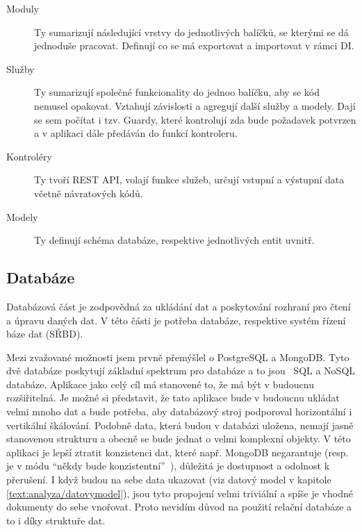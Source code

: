 \begin{description}
    \item[Moduly] Ty sumarizují následující vrstvy do jednotlivých balíčků, se kterými se dá jednoduše pracovat. Definují co se má exportovat a importovat v rámci DI.
    \item[Služby] Ty sumarizují společné funkcionality do jednoo balíčku, aby se kód nemusel opakovat. Vztahují závislosti a agregují další služby a modely. Dají se sem počítat i tzv. Guardy, které kontrolují zda bude požadavek potvrzen a v aplikaci dále předáván do funkcí kontroleru.
    \item[Kontroléry] Ty tvoří REST API, volají funkce služeb, určují vstupní a výstupní data včetně návratových kódů.
    \item[Modely] Ty definují schéma databáze, respektive jednotlivých entit uvnitř.
\end{description}


\subsection{Databáze}\label{text:navrh/databaze}

Databázová část je zodpovědná za ukládání dat a poskytování rozhraní pro čtení a úpravu daných dat. 
V této části je potřeba databáze, respektive systém řízení báze dat (SŘBD).

Mezi zvažované možnosti jsem prvně přemýšlel o PostgreSQL a MongoDB.
Tyto dvě databáze poskytují základní spektrum pro databáze a to jsou~\cite{irena2015big, marek2018sql} SQL a NoSQL databáze. 
Aplikace jako celý cíl má stanovené to, že má být v budoucnu rozšiřitelná.
Je možné si představit, že tato aplikace bude v budoucnu ukládat velmi mnoho dat a bude potřeba, aby databázový stroj podporoval horizontální i vertikální škálování.
Podobně data, která budou v databázi uložena, nemají jasně stanovenou strukturu a obecně se bude jednat o velmi komplexní objekty.
V této aplikaci je lepší ztratit konzistenci dat, které např. MongoDB negarantuje (resp. je v módu \enquote{někdy bude konzistentní}~\cite{irena2015big}), důležitá je dostupnost a odolnost k přerušení.
I když budou na sebe data ukazovat (viz datový model v kapitole \ref{text:analyza/datovymodel}), jsou tyto propojení velmi triviální a spíše je vhodné dokumenty do sebe vnořovat.
Proto nevidím důvod na použití relační databáze a to i díky struktuře dat.

